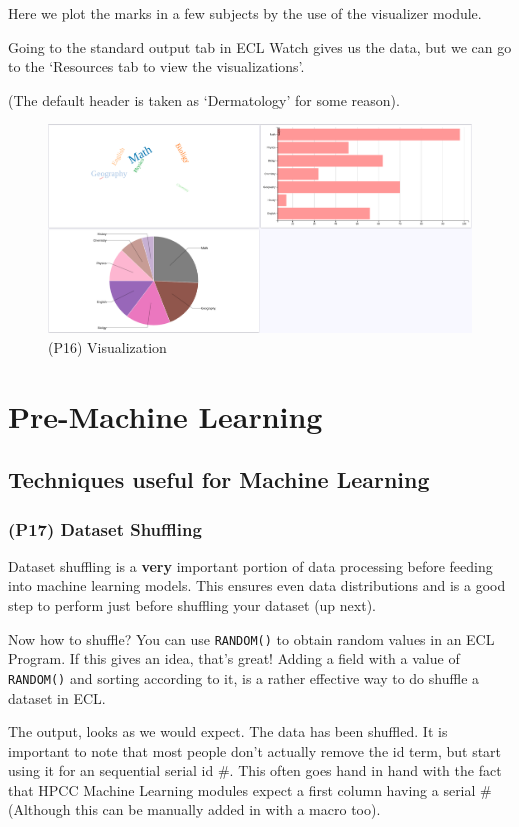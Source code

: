 Here we plot the marks in a few subjects by the use of the visualizer module.




Going to the standard output tab in ECL Watch gives us the data, but we can go to the `Resources tab to view the visualizations'.

(The default header is taken as `Dermatology' for some reason).

\begin{figure}[h]
    \centering
    \includegraphics[width=.6\linewidth]{../output/79/1}
    \caption{(P16) Visualization}
\end{figure}




\chapter{Pre-Machine Learning}
\section{Techniques useful for Machine Learning}
\subsection[Dataset Shuffling]{(P17) Dataset Shuffling}

Dataset shuffling is a \textbf{very} important portion of data processing before feeding into machine learning models. This ensures even data distributions and is a good step to perform just before shuffling your dataset (up next).

Now how to shuffle? You can use \lstinline{RANDOM()} to obtain random values in an ECL Program. If this gives an idea, that's great! Adding a field with a value of \lstinline{RANDOM()} and sorting according to it, is a rather effective way to do shuffle a dataset in ECL.



The output, looks as we would expect. The data has been shuffled. It is important to note that most people don't actually remove the id term, but start using it for an sequential serial id \#. This often goes hand in hand with the fact that HPCC Machine Learning modules expect a first column having a serial \# (Although this can be manually added in with a macro too).


